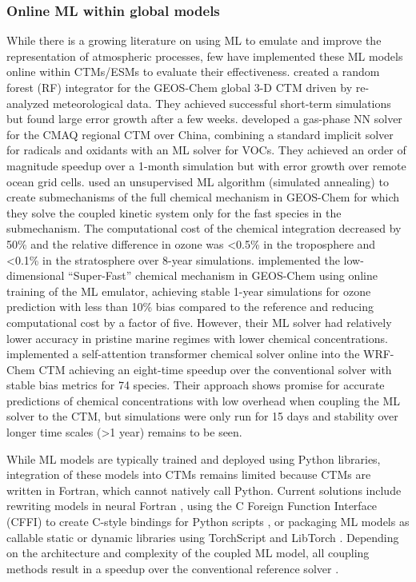\documentclass[gmd, manuscript]{copernicus}
\begin{document}
\subsubsection{Online ML within global models}
While there is a growing literature on using ML to emulate and improve the representation of atmospheric processes, few have implemented these ML models online within CTMs/ESMs to evaluate their effectiveness. \citet{keller_application_2019} created a random forest (RF) integrator for the GEOS-Chem global 3-D CTM driven by re-analyzed meteorological data. They achieved successful short-term simulations but found large error growth after a few weeks. \citet{liu_correcting_2022} developed a gas-phase NN solver for the CMAQ regional CTM over China, combining a standard implicit solver for radicals and oxidants with an ML solver for VOCs. They achieved an order of magnitude speedup over a 1-month simulation but with error growth over remote ocean grid cells. \citet{shen_machine-learning-guided_2022} used an unsupervised ML algorithm (simulated annealing) to create submechanisms of the full chemical mechanism in GEOS-Chem for which they solve the coupled kinetic system only for the fast species in the submechanism. The computational cost of the chemical integration decreased by 50\% and the relative difference in ozone was <0.5\% in the troposphere and <0.1\% in the stratosphere over 8-year simulations. \citet{kelp_online-learned_2022} implemented the low-dimensional “Super-Fast” chemical mechanism in GEOS-Chem using online training of the ML emulator, achieving stable 1-year simulations for ozone prediction with less than 10\% bias compared to the reference and reducing computational cost by a factor of five. However, their ML solver had relatively lower accuracy in pristine marine regimes with lower chemical concentrations. \citet{xia_advancing_2024} implemented a self-attention transformer chemical solver online into the WRF-Chem CTM achieving an eight-time speedup over the conventional solver with stable bias metrics for 74 species. Their approach shows promise for accurate predictions of chemical concentrations with low overhead when coupling the ML solver to the CTM, but simulations were only run for 15 days and stability over longer time scales (>1 year) remains to be seen. 

While ML models are typically trained and deployed using Python libraries, integration of these models into CTMs remains limited because CTMs are written in Fortran, which cannot natively call Python. Current solutions include rewriting models in neural Fortran \citep{keller_application_2019}, using the C Foreign Function Interface (CFFI) to create C-style bindings for Python scripts \citep{kelp_online-learned_2022, zhong_wrfml_2023}, or packaging ML models as callable static or dynamic libraries using TorchScript and LibTorch \citep{xia_advancing_2024}. Depending on the architecture and complexity of the coupled ML model, all coupling methods result in a speedup over the conventional reference solver \citep{de_burgh-day_machine_2023}.
\end{document}
